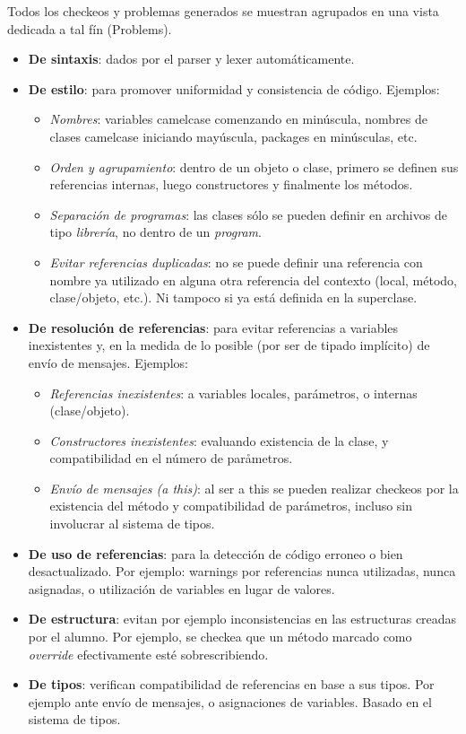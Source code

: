 Todos los checkeos y problemas
generados se muestran agrupados en una vista dedicada a tal fín (Problems).

\begin{itemize}
   \item \textbf{De sintaxis}: dados por el parser y lexer automáticamente.
  \item \textbf{De estilo}: para promover uniformidad y consistencia de código.
  Ejemplos:
  		\begin{itemize}
  			\item \textit{Nombres}: variables camelcase comenzando en minúscula,
  			nombres de clases camelcase iniciando mayúscula, packages en minúsculas, etc.
  			\item \textit{Orden y agrupamiento}: dentro de un objeto o clase, primero
  			se definen sus referencias internas, luego constructores y finalmente los métodos.
  			\item \textit{Separación de programas}: las clases sólo se pueden definir
  			en archivos de tipo \textit{librería}, no dentro de un \textit{program}.
  			\item \textit{Evitar referencias duplicadas}: no se puede definir una
  			referencia con nombre ya utilizado en alguna otra referencia del contexto (local, método,
  			clase/objeto, etc.). Ni tampoco si ya está definida en la superclase.
		\end{itemize}
  \item \textbf{De resolución de referencias}: para evitar referencias a
  variables inexistentes y, en la medida de lo posible (por ser de tipado
  implícito) de envío de mensajes. Ejemplos:
  		\begin{itemize}
		  \item \textit{Referencias inexistentes}: a variables locales, parámetros, o
		  internas (clase/objeto).
		  \item \textit{Constructores inexistentes}: evaluando existencia de la
		  clase, y compatibilidad en el número de paråmetros.
		  \item \textit{Envío de mensajes (a this)}: al ser a this se pueden realizar
		  checkeos por la existencia del método y compatibilidad de parámetros, incluso sin
		  involucrar al sistema de tipos.
		\end{itemize}
  \item \textbf{De uso de referencias}: para la detección de código
  	erroneo o bien desactualizado. Por ejemplo: warnings por referencias nunca
 	utilizadas, nunca asignadas, o utilización de variables en lugar de valores.
  \item \textbf{De estructura}: evitan por ejemplo inconsistencias en las
  estructuras creadas por el alumno. Por ejemplo, se checkea
  que un método marcado como \textit{override} efectivamente esté
	sobrescribiendo.
  \item \textbf{De tipos}: verifican compatibilidad de referencias en base a sus
  tipos. Por ejemplo ante envío de mensajes, o asignaciones de variables. Basado
  en el sistema de tipos.
\end{itemize}



